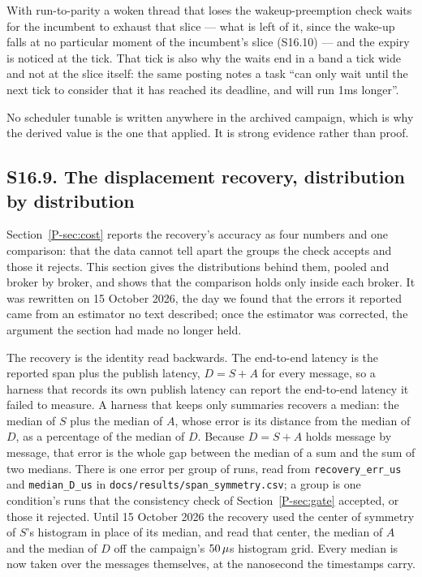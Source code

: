 \documentclass[10pt,journal,onecolumn]{IEEEtran}
\newcommand{\mainGate}{\ref{P-sec:gate}}            %
\newcommand{\mainCost}{\ref{P-sec:cost}}              %
\begin{document}
With run-to-parity a woken thread that loses the wakeup-preemption check waits for the
incumbent to exhaust that slice --- what is left of it, since the wake-up falls at no particular
moment of the incumbent's slice (S16.10) --- and the expiry is noticed at the tick. That tick is
also why the waits end in a band a tick wide and not at the slice itself: the same posting notes
a task ``can only wait until the next tick to consider that it has reached its deadline, and will
run 1ms longer''.

No scheduler tunable is written anywhere in the archived campaign, which is why the derived
value is the one that applied. It is strong evidence rather than proof.

\subsection{S16.9. The displacement recovery, distribution by distribution}

Section~\mainCost{} reports the recovery's accuracy as four numbers and one comparison: that the
data cannot tell apart the groups the check accepts and those it rejects. This section gives the
distributions behind them, pooled and broker by broker, and shows that the comparison holds only
inside each broker. It was rewritten on 15 October 2026, the day we found that the errors it
reported came from an estimator no text described; once the estimator was corrected, the
argument the section had made no longer held.

The recovery is the identity read backwards. The end-to-end latency is the reported span plus
the publish latency, $D = S + A$ for every message, so a harness that records its own publish
latency can report the end-to-end latency it failed to measure. A harness that keeps only
summaries recovers a median: the median of $S$ plus the median of $A$, whose error is its
distance from the median of $D$, as a percentage of the median of $D$. Because $D = S + A$ holds
message by message, that error is the whole gap between the median of a sum and the sum of two
medians. There is one error per group of runs, read from \texttt{recovery\_err\_us} and
\texttt{median\_D\_us} in \texttt{docs/results/span\_symmetry.csv}; a group is one condition's
runs that the consistency check of Section~\mainGate{} accepted, or those it rejected. Until
15 October 2026 the recovery used the center of symmetry of $S$'s histogram in place of
its median, and read that center, the median of $A$ and the median of $D$ off the campaign's
$50\,\mu$s histogram grid. Every median is now taken over the messages
themselves, at the nanosecond the timestamps carry.
\end{document}
